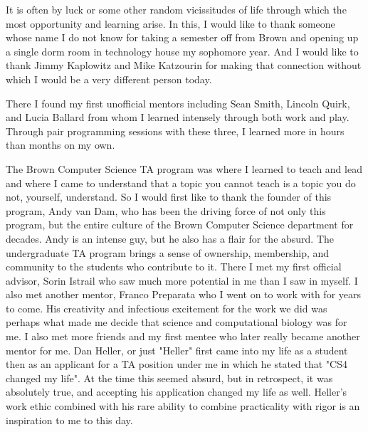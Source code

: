
\begin{acknowledgements}      


It is often by luck or some other random vicissitudes of life through which the most opportunity and learning arise. In this, I would like to thank someone whose name I do not know for taking a semester off from Brown and opening up a single dorm room in technology house my sophomore year. And I would like to thank Jimmy Kaplowitz and Mike Katzourin for making that connection without which I would be a very different person today. 

There I found my first unofficial mentors including Sean Smith, Lincoln Quirk, and Lucia Ballard from whom I learned intensely through both work and play. Through pair programming sessions with these three, I learned more in hours than months on my own. 

The Brown Computer Science TA program was where I learned to teach and lead and where I came to understand that a topic you cannot teach is a topic you do not, yourself, understand. So I would first like to thank the founder of this program, Andy van Dam, who has been the driving force of not only this program, but the entire culture of the Brown Computer Science department for decades. Andy is an intense guy, but he also has a flair for the absurd. The undergraduate TA program brings a sense of ownership, membership, and community to the students who contribute to it. There I met my first official advisor, Sorin Istrail who saw much more potential in me than I saw in myself. I also met another mentor, Franco Preparata who I went on to work with for years to come. His creativity and infectious excitement for the work we did was perhaps what made me decide that science and computational biology was for me. I also met more friends and my first mentee who later really became another mentor for me. Dan Heller, or just "Heller" first came into my life as a student then as an applicant for a TA position under me in which he stated that "CS4 changed my life". At the time this seemed absurd, but in retrospect, it was absolutely true, and accepting his application changed my life as well. Heller's work ethic combined with his rare ability to combine practicality with rigor is an inspiration to me to this day. 


\end{acknowledgements}
